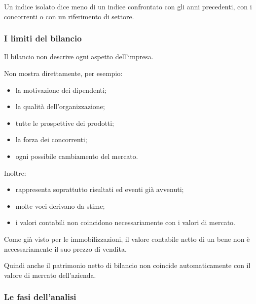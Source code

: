 \noindent Un indice isolato
dice meno di un indice confrontato
con gli anni precedenti,
con i concorrenti
o con un riferimento di settore.


\subsubsection*{I limiti del bilancio}

\noindent Il bilancio
non descrive ogni aspetto dell'impresa.

\noindent Non mostra direttamente,
per esempio:

\begin{itemize}
    \item la motivazione dei dipendenti;
    \item la qualità dell'organizzazione;
    \item tutte le prospettive dei prodotti;
    \item la forza dei concorrenti;
    \item ogni possibile cambiamento del mercato.
\end{itemize}

\noindent Inoltre:

\begin{itemize}
    \item rappresenta soprattutto
    risultati ed eventi già avvenuti;

    \item molte voci derivano da stime;

    \item i valori contabili
    non coincidono necessariamente
    con i valori di mercato.
\end{itemize}

\noindent Come già visto
per le immobilizzazioni,
il valore contabile netto di un bene
non è necessariamente
il suo prezzo di vendita.

\noindent Quindi anche il patrimonio netto
di bilancio non coincide automaticamente
con il valore di mercato dell'azienda.


\subsubsection*{Le fasi dell'analisi}


